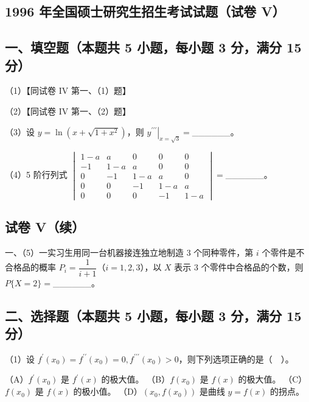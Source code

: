 \documentclass[UTF8,12pt]{ctexart}
\begin{document}
\subsection*{1996 年全国硕士研究生招生考试试题（试卷 V）}

\subsection*{一、填空题（本题共 5 小题，每小题 3 分，满分 15 分）}

（1）【同试卷 IV 第一、（1）题】


（2）【同试卷 IV 第一、（2）题】


（3）设 \(\displaystyle y=\ln\left(x+\sqrt{1+x^2}\right)\)，则 \(\displaystyle \left.y^{\prime\prime\prime}\right|_{x=\sqrt3}=\)\_\_\_\_\_\_。


（4）5 阶行列式 \(\displaystyle \begin{vmatrix}1-a&a&0&0&0\\-1&1-a&a&0&0\\0&-1&1-a&a&0\\0&0&-1&1-a&a\\0&0&0&-1&1-a\end{vmatrix}=\)\_\_\_\_\_\_。


\subsection*{试卷 V（续）}

一、（5）一实习生用同一台机器接连独立地制造 3 个同种零件，第 \(\displaystyle i\) 个零件是不合格品的概率 \(\displaystyle P_i=\dfrac{\displaystyle 1}{\displaystyle i+1}\)（\(\displaystyle i=1,\allowbreak 2,\allowbreak 3\)），以 \(\displaystyle X\) 表示 3 个零件中合格品的个数，则 \(\displaystyle P\{X=2\}=\)\_\_\_\_\_\_。


\subsection*{二、选择题（本题共 5 小题，每小题 3 分，满分 15 分）}

（1）设 \(\displaystyle f^{\prime}(x_0)=f^{\prime\prime}(x_0)=0,\allowbreak  f^{\prime\prime\prime}(x_0)>0\)，则下列选项正确的是（　）。


（A）\(\displaystyle f^{\prime}(x_0)\) 是 \(\displaystyle f^{\prime}(x)\) 的极大值。 （B）\(\displaystyle f(x_0)\) 是 \(\displaystyle f(x)\) 的极大值。 （C）\(\displaystyle f(x_0)\) 是 \(\displaystyle f(x)\) 的极小值。 （D）\(\displaystyle (x_0,\allowbreak f(x_0))\) 是曲线 \(\displaystyle y=f(x)\) 的拐点。
\end{document}
